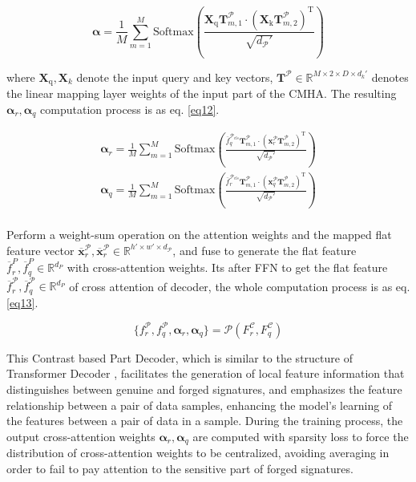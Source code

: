\begin{equation}
\label{eq11}
  \boldsymbol{\alpha}= \frac{1}{M}\sum^M_{m=1} \text{Softmax}\left( \frac{\boldsymbol{X}_\text{q}\mathbf{T}^\mathcal{P}_{m, 1}\cdot (\boldsymbol{X}_\text{k}\mathbf{T}^\mathcal{P}_{m, 2})^\mathrm{T} }{\sqrt{d_\mathcal{P}'}} \right)
\end{equation}

where $\boldsymbol{X}_\text{q},\boldsymbol{X}_k$ denote the input query and key vectors, $\mathbf{T}^\mathcal{P} \in \mathbb{R}^{M\times 2\times D\times d_k′}$ denotes the linear mapping layer weights of the input part of the CMHA. The resulting $\boldsymbol{\alpha}_r,\boldsymbol{\alpha}_q$ computation process is as eq. \ref{eq12}.

\begin{equation}
\label{eq12}
\begin{aligned}
  \boldsymbol{\alpha}_r = \frac{1}{M}\sum^M_{m=1} \text{Softmax}\left( \frac{\overline{f}_q^{\mathcal{P}_{cls}}\mathbf{T}^\mathcal{P}_{m, 1}\cdot (\boldsymbol{x}_r^\mathcal{P}\mathbf{T}^\mathcal{P}_{m, 2})^\mathrm{T} }{\sqrt{d_\mathcal{P}'}} \right) \\
  \boldsymbol{\alpha}_q = \frac{1}{M}\sum^M_{m=1} \text{Softmax}\left( \frac{\overline{f}_r^{\mathcal{P}_{cls}}\mathbf{T}^\mathcal{P}_{m, 1}\cdot (\boldsymbol{x}_q^\mathcal{P}\mathbf{T}^\mathcal{P}_{m, 2})^\mathrm{T} }{\sqrt{d_\mathcal{P}'}} \right) \\
\end{aligned}
\end{equation}

Perform a weight-sum operation on the attention weights and the mapped flat feature vector $\overline{\boldsymbol{x}}_r^\mathcal{P},\overline{\boldsymbol{x}}_r^\mathcal{P}\in \mathbb{R}^{h'\times w'\times d_\mathcal{P}}$, and fuse to generate the flat feature $\overline{f}_r^P,\overline{f}_q^P\in \mathbb{R}^{d_P}$ with cross-attention weights. Its after FFN to get the flat feature $\overline{f}_r^\mathcal{P},\overline{f}_q^\mathcal{P}\in \mathbb{R}^{d_P}$ of cross attention of decoder, the whole computation process is as eq. \ref{eq13}.

\begin{equation}
\label{eq13}
  \{f_r^\mathcal{P},f_q^\mathcal{P},\boldsymbol{\alpha}_r,\boldsymbol{\alpha}_q \}=\mathcal{P}(F_r^\mathcal{C},F_q^\mathcal{C} )
\end{equation}

This Contrast based Part Decoder, which is similar to the structure of Transformer Decoder \cite{36}, facilitates the generation of local feature information that distinguishes between genuine and forged signatures, and emphasizes the feature relationship between a pair of data samples, enhancing the model's learning of the features between a pair of data in a sample. During the training process, the output cross-attention weights $\boldsymbol{\alpha}_r,\boldsymbol{\alpha}_q$ are computed with sparsity loss to force the distribution of cross-attention weights to be centralized, avoiding averaging in order to fail to pay attention to the sensitive part of forged signatures.

